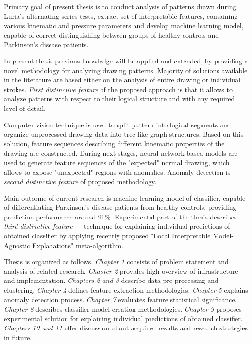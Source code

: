 Primary goal of present thesis is to conduct analysis of patterns drawn during Luria’s alternating series tests, extract set of interpretable features, containing various kinematic and pressure parameters and develop machine learning model, capable of correct distinguishing between groups of healthy controls and Parkinson’s disease patients.

In present thesis previous knowledge will be applied and extended, by providing a novel methodology for analyzing drawing patterns. Majority of solutions available in the literature are based either on the analysis of entire drawing or individual strokes. \textit{First distinctive feature} of the proposed approach is that it allows to analyze patterns with respect to their logical structure and with any required level of detail.

Computer vision technique is used to split pattern into logical segments and organize unprocessed drawing data into tree-like graph structures. Based on this solution, feature sequences describing different kinematic properties of the drawing are constructed. During next stages, neural-network based models are used to generate feature sequences of the "expected" normal drawing, which allows to expose "unexpected" regions with anomalies. Anomaly detection is \textit{second distinctive feature} of proposed methodology. 

Main outcome of current research is machine learning model of classifier, capable of differentiating Parkinson's disease patients from healthy controls, providing prediction performance around 91\%. Experimental part of the thesis describes \textit{third distinctive feature} --- technique for explaining individual predictions of obtained classifier by applying recently proposed "Local Interpretable Model-Agnostic Explanations" \cite{ribeiro2016should} meta-algorithm.

Thesis is organized as follows. \textit{Chapter 1} consists of problem statement and analysis of related research. \textit{Chapter 2} provides high overview of infrastructure and implementation. \textit{Chapters 2 and 3} describe data pre-processing and clustering. \textit{Chapter 4} defines feature extraction methodologies. \textit{Chapter 5} explains anomaly detection process. \textit{Chapter 7} evaluates feature statistical significance. \textit{Chapter 8} describes classifier model creation methodologies. \textit{Chapter 9} proposes experimental solution for explaining individual predictions of obtained classifier. \textit{Chapters 10 and 11} offer discussion about acquired results and research strategies in future.

